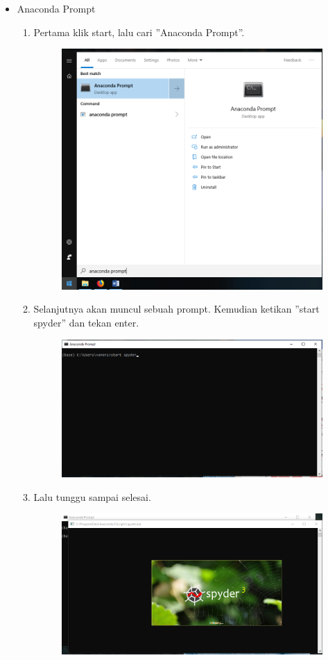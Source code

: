 \begin{itemize}
	\item Anaconda Prompt

	\begin{enumerate}
		
		\item Pertama klik start, lalu cari ''Anaconda Prompt''.
		\begin{figure}[H]
			\includegraphics[width=10cm]{figures/diva/11chp1diva.png}
			\centering
		\end{figure}		
		\item Selanjutnya akan muncul sebuah prompt. Kemudian ketikan ''start spyder'' dan tekan enter.
		\begin{figure}[H]
			\includegraphics[width=10cm]{figures/diva/12chp1diva.png}
			\centering
		\end{figure}
		\item Lalu tunggu sampai selesai.
		\begin{figure}[H]
			\includegraphics[width=10cm]{figures/diva/13chp1diva.png}
			\centering
		\end{figure}


\end{enumerate}
\end{itemize}
